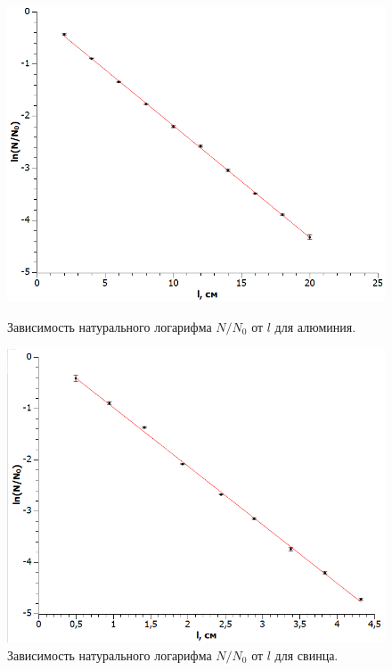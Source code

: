 \documentclass[a4paper, 12pt]{article}%
\begin{document}
\begin{enumerate}
	\begin{figure}[h!]
        \begin{center}
            \begin{minipage}[h!]{0.48\linewidth}
                \includegraphics[width=1\linewidth]{images/graph_1.png}
                \caption{Зависимость натурального логарифма $N/N_0$ от $l$ для алюминия.}
                \label{Table_2}
            \end{minipage}
            \hfill
            \begin{minipage}[h!]{0.48\linewidth}
                \includegraphics[width=1\linewidth]{images/graph_2.png}
                \caption{Зависимость натурального логарифма $N/N_0$ от $l$ для свинца.}
                \label{Table_3}
            \end{minipage}
        \end{center}
    \end{figure}		
		

\end{enumerate}
\end{document}

